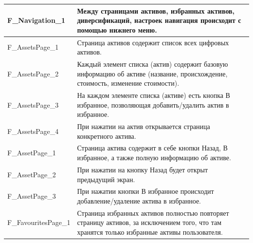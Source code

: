 \documentclass[a4paper, 14pt]{article}
\begin{document}
\begin{longtable}{| p{} | p{} |}
    F\_Navigation\_1                & Между страницами активов, избранных активов, диверсификаций, настроек навигация происходит с помощью нижнего меню.                                                                 \\ \hline

    F\_AssetsPage\_1                & Страница активов содержит список всех цифровых активов.                                                                                                                            \\ \hline
    F\_AssetsPage\_2                & Каждый элемент списка (актив) содержит базовую информацию об активе (название, происхождение, стоимость, изменение стоимости).                                                     \\ \hline
    F\_AssetsPage\_3                & На каждом элементе списка (активе) есть кнопка В избранное, позволяющая добавить/удалить актив в избранное.                                                                        \\ \hline
    F\_AssetsPage\_4                & При нажатии на актив открывается страница конкретного актива.                                                                                                                      \\ \hline

    F\_AssetPage\_1                 & Страница актива содержит в себе кнопки Назад, В избранное, а также полную информацию об активе.                                                                                    \\ \hline
    F\_AssetPage\_2                 & При нажатии на кнопку Назад будет открыт предыдущий экран.                                                                                                                         \\ \hline
    F\_AssetPage\_3                 & При нажатии кнопки В избранное происходит добавление/удаление актива в избранное.                                                                                                  \\ \hline

    F\_FavouritesPage\_1            & Страница избранных активов полностью повторяет страницу активов, за исключением того, что там хранятся только избранные активы пользователя.                                       \\ \hline


\end{longtable}
\end{document}
